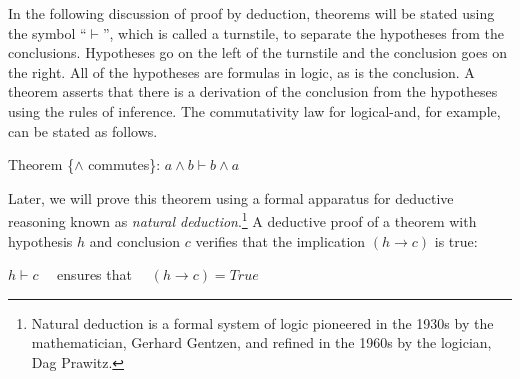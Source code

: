 In the following discussion of proof by deduction,
theorems will be stated using the symbol ``$\vdash$'',
which is called a turnstile, to separate the hypotheses from the conclusions.
Hypotheses go on the left of the turnstile and the conclusion goes on the right.
All of the hypotheses are formulas in logic, as is the conclusion.
A theorem asserts that there is a derivation of the conclusion
from the hypotheses using the rules of inference.
The commutativity law for logical-and, for example,
can be stated as follows.
\begin{center}
Theorem \{$\wedge$ commutes\}: $a \wedge b \vdash b \wedge a$
\end{center}

Later, we will prove this theorem using a formal apparatus
for deductive reasoning known as
\emph{natural deduction}.\footnote{Natural
deduction is a formal system of logic pioneered in the 1930s
by the mathematician, Gerhard Gentzen, and refined in the 1960s
by the logician, Dag Prawitz.}
A deductive proof of a theorem with hypothesis $h$ and conclusion $c$
verifies that the implication $(h \rightarrow c)$ is true:
\begin{center}
$h \vdash c$ ~~ensures that~~ $(h \rightarrow c) = True$
\end{center}


